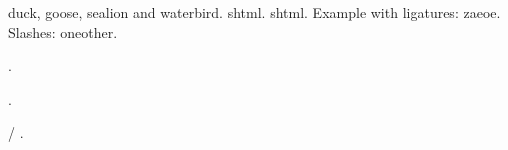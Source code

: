 \documentclass{article}
\begin{document}
\Gls{duck}, \gls{goose}, \gls{sealion} and \gls{waterbird}.
\Gls{shtml}. \Gls{shtml}. Example with ligatures: \gls{zaeoe}.
Slashes: \gls{oneother}.

.

.

 /
.

\printunsrtglossaries
\end{document}
